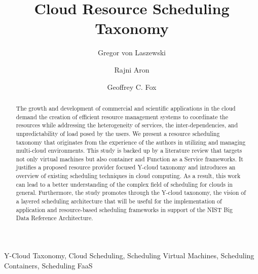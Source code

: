 \documentclass[final,5p,times,twocolumn]{elsarticle}
\author[label1]{Gregor von Laszewski\corref{cor1}\fnref{label3}}
\author[label2]{Rajni Aron}
\author[label1]{Geoffrey C. Fox}
\newcommand{\TITLE}{Cloud Resource Scheduling Taxonomy }
\begin{document}
\onecolumn







\begin{frontmatter}
\title{\TITLE}

\maketitle



\begin{keyword}

 Y-Cloud Taxonomy,
 Cloud Scheduling,
 Scheduling Virtual Machines,
 Scheduling Containers,
 Scheduling FaaS

\end{keyword}

\begin{abstract}

The growth and development of commercial and scientific applications in the cloud demand the creation of efficient resource management systems to coordinate the resources while addressing the heterogeneity of services, the inter-dependencies, and unpredictability of load posed by the users.
We present a resource scheduling taxonomy that originates from the experience of the authors in utilizing and managing multi-cloud environments. This study is backed up by a literature review that targets not only virtual machines but also container and Function as a Service frameworks. It justifies a proposed resource provider focused Y-cloud taxonomy and introduces an overview of existing scheduling techniques in cloud computing. As a result, this work can lead to a better understanding of the complex field of scheduling for clouds in general. Furthermore, the study promotes through the Y-cloud taxonomy, the vision of a layered scheduling architecture that will be useful for the implementation of application and resource-based scheduling frameworks in support of the NIST Big Data Reference Architecture.

\end{abstract}

\end{frontmatter}
\end{document}
